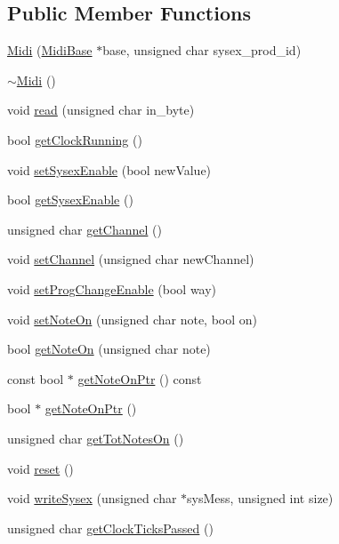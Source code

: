\subsection*{Public Member Functions}
\begin{DoxyCompactItemize}
\item 
\hyperlink{class_midi_aaf0c677f66873f3743cf41e655309df9}{Midi} (\hyperlink{class_midi_base}{Midi\+Base} $\ast$base, unsigned char sysex\+\_\+prod\+\_\+id)
\item 
\hyperlink{class_midi_a3caa6150d8a34528c034eac4697e36b6}{$\sim$\+Midi} ()
\item 
void \hyperlink{class_midi_a6003d2a28da28e44143e494faf16acd9}{read} (unsigned char in\+\_\+byte)
\item 
bool \hyperlink{class_midi_ad4330bfa4bc5e7342eed4b083fcae837}{get\+Clock\+Running} ()
\item 
void \hyperlink{class_midi_acaafd80faacb549f02be82e284663d75}{set\+Sysex\+Enable} (bool new\+Value)
\item 
bool \hyperlink{class_midi_ad62ae6ae2d3ca5b4d35afa62b1a8c4c8}{get\+Sysex\+Enable} ()
\item 
unsigned char \hyperlink{class_midi_a8372b7a7ac61f3f066d0932228cb53f8}{get\+Channel} ()
\item 
void \hyperlink{class_midi_ab4278443129bc124d46a9f06723283a6}{set\+Channel} (unsigned char new\+Channel)
\item 
void \hyperlink{class_midi_adba21f11f8a0f7d835604ba68a9414ab}{set\+Prog\+Change\+Enable} (bool way)
\item 
void \hyperlink{class_midi_a981761bdfa5f3f9637cdac108d88ba35}{set\+Note\+On} (unsigned char note, bool on)
\item 
bool \hyperlink{class_midi_a7e93abeb7622eeaa7dbe8480de030d0b}{get\+Note\+On} (unsigned char note)
\item 
const bool $\ast$ \hyperlink{class_midi_a24bd886dbe0a2ab6c9b3c0739f613f2b}{get\+Note\+On\+Ptr} () const
\item 
bool $\ast$ \hyperlink{class_midi_ac45251220870ecd342ececc1e3a87f18}{get\+Note\+On\+Ptr} ()
\item 
unsigned char \hyperlink{class_midi_a138bcab57f6cf89474d774de29be9939}{get\+Tot\+Notes\+On} ()
\item 
void \hyperlink{class_midi_a2b55e3e055e1076a4113374ec3c06056}{reset} ()
\item 
void \hyperlink{class_midi_a57efc17c9561b9ca9763d610b4feea9e}{write\+Sysex} (unsigned char $\ast$sys\+Mess, unsigned int size)
\item 
unsigned char \hyperlink{class_midi_aaa7e1badd1370989aad99509b95b343b}{get\+Clock\+Ticks\+Passed} ()
\end{DoxyCompactItemize}
